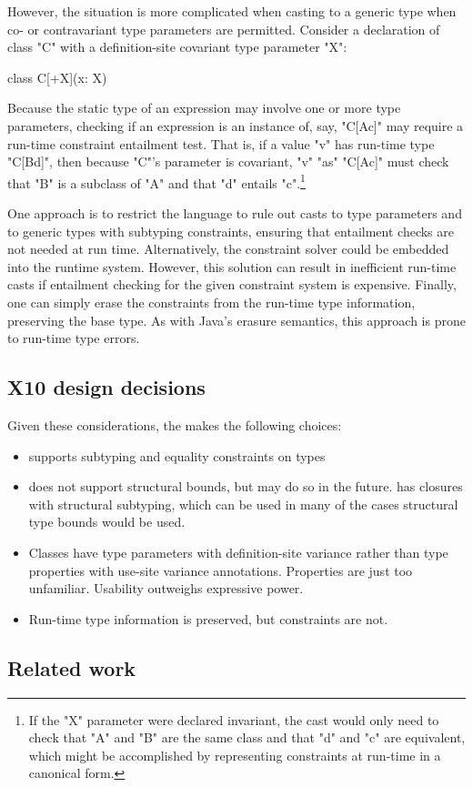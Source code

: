However, the situation is more complicated when casting to a
generic type when co- or contravariant
type parameters are permitted.  Consider a declaration of class
\xcd"C" with a definition-site covariant type parameter \xcd"X":
\begin{xtenmath}
class C[+X](x: X) { }
\end{xtenmath}
\noindent
Because the static type of an expression may involve one or more
type parameters,
checking if an expression is an instance of, say, \xcd"C[A{c}]"
may require a run-time constraint entailment test.  That is,
if a value \xcd"v"
has run-time type \xcd"C[B{d}]", then because \xcd"C"'s
parameter is covariant,
\xcd"v" \xcd"as" \xcd"C[A{c}]" must check that \xcd"B" is a subclass of
\xcd"A" and that \xcd"d" entails \xcd"c".\footnote{If the
\xcd"X" parameter were declared invariant, the cast would only
need to check that \xcd"A" and \xcd"B" are the same class and
that \xcd"d" and \xcd"c" are equivalent, which might be
accomplished by representing constraints at run-time in a
canonical form.}

One approach is to restrict the language 
to rule out casts to type parameters 
and to generic types with subtyping constraints, ensuring that
entailment checks are not needed at run time.
Alternatively, 
the constraint solver could be embedded into the runtime system.
However, this
solution can result in inefficient run-time casts
if entailment checking for the given constraint system is expensive.
Finally, one can simply erase the constraints from the run-time
type information, preserving the base type.  As with Java's
erasure semantics, this approach is prone to run-time type
errors.

\subsection{X10 design decisions}

Given these considerations, the \Xten makes the following choices:
\begin{itemize}
\item \Xten supports subtyping and equality constraints on types
\item \Xten does not support structural bounds, but may do so in
the future.  \Xten has closures with structural subtyping, which
can be used in many of the cases structural type bounds would be
used.
\item Classes have type parameters with definition-site variance
rather than type properties with use-site variance annotations.
Properties are just too unfamiliar.
Usability outweighs expressive power. 
\item Run-time type information is preserved, but constraints
are not.  
\end{itemize}


\subsection{Related work}
\label{sec:related}

